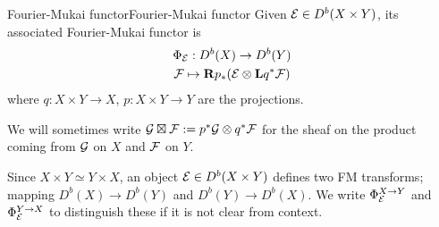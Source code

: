 \begin{definition}{Fourier-Mukai functor}{Fourier-Mukai functor}
    Given $\mathcal{E}\in D^b(X\times Y)$, its associated Fourier-Mukai functor is
    \begin{gather*}
        \Phi_{\mathcal{E}} : D^b(X)\to D^b(Y) \\
        \mathcal{F} \mapsto \mathbf{R} p_{*}(\mathcal{E}\otimes\mathbf{L} q^*\mathcal{F})
    \end{gather*}
    where $q:X\times Y\to X$, $p:X\times Y\to Y$ are the projections.
\end{definition}

We will sometimes write $\mathcal{G} \boxtimes \mathcal{F} := p^* \mathcal{G} \otimes q^* \mathcal{F}$ for the sheaf on the product coming from $\mathcal{G}$ on $X$ and $\mathcal{F}$ on $Y$.

\begin{remark}{}{}
    Since $X\times Y\simeq Y\times X$, an object $\mathcal{E}\in D^b(X\times Y)$
    defines two FM transforms; mapping $D^b(X)\to D^b(Y)$ and
    $D^b(Y)\to D^b(X)$. We write $\Phi^{X\to Y}_{\mathcal{E}}$ and $\Phi^{Y\to X}_{\mathcal{E}}$
    to distinguish these if it is not clear from context.
\end{remark}

